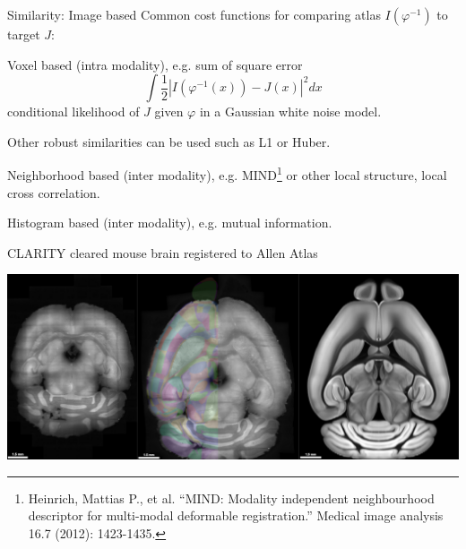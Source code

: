 \documentclass{beamer}
\begin{document}
\begin{frame}{Similarity: Image based}
Common cost functions for comparing atlas $I(\varphi^{-1})$ to target $J$:

\vspace{1em}


\alert{Voxel based (intra modality)}, e.g. sum of square error
$$
\int \frac12 |I(\varphi^{-1}(x)) - J(x)|^2 dx
$$
conditional \alert{likelihood} of $J$ given $\varphi$ in a Gaussian white noise model.  

Other robust similarities can be used such as L1 or Huber.

\vspace{1em}


\alert{Neighborhood based (inter modality)}, e.g. MIND\footnote{Heinrich, Mattias P., et al. ``MIND: Modality independent neighbourhood descriptor for multi-modal deformable registration.'' Medical image analysis 16.7 (2012): 1423-1435.} or other local structure, local cross correlation.

\vspace{1em}

\alert{Histogram based  (inter modality)}, e.g. mutual information.



\end{frame}






\begin{frame}{CLARITY cleared mouse brain registered to Allen Atlas}

\includegraphics[width=\textwidth]{CLARITY_mouse_registration.png}

\end{frame}
\end{document}
